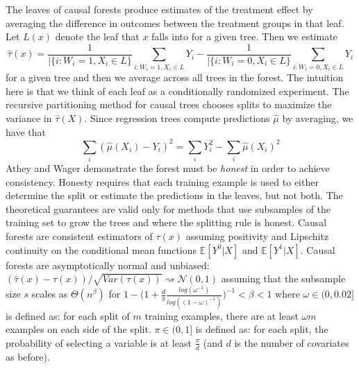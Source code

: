 \documentclass{article}
\begin{document}
The leaves of causal forests produce estimates of the treatment effect by averaging the difference in outcomes between the treatment groups in that leaf. Let $L(x)$ denote the leaf that $x$ falls into for a given tree. Then we estimate 
\begin{equation}
    \hat{\tau}(x) = \frac{1}{|\{i: W_i =1, X_i \in L \}} \sum_{i: W_i =1, X_i \in L} Y_i - \frac{1}{|\{i: W_i =0, X_i \in L \}} \sum_{i: W_i =0, X_i \in L} Y_i
\end{equation}
for a given tree and then we average across all trees in the forest. The intuition here is that we think of each leaf as a conditionally randomized experiment. 
The recursive partitioning method for causal trees chooses splits to maximize the variance in $\hat{\tau}(X)$\cite{athey2016recursive}. Since regression trees compute predictions $\hat{\mu}$ by averaging, we have that 
\begin{equation}
    \sum_i (\hat{\mu}(X_i) - Y_i)^2 = \sum_i Y_i^2 - \sum_i \hat{\mu}(X_i)^2
\end{equation}
Athey and Wager demonstrate the forest must be \textit{honest} in order to achieve consistency. Honesty requires that each training example is used to either determine the split or estimate the predictions in the leaves, but not both. The theoretical guarantees are valid only for methods that use subsamples of the training set to grow the trees and where the splitting rule is honest.
Causal forests are consistent estimators of $\tau(x)$ assuming positivity and Lipschitz continuity on the conditional mean functions $\mathbb{E}[ Y^0 |X]$ and $\mathbb{E}[ Y^1 |X]$. Causal forests are asymptotically normal and unbiased: \\$(\hat{\tau}(x) - \tau(x)) / \sqrt{Var(\hat{\tau}(x))}  \rightsquigarrow \mathcal{N}(0,1)$
assuming that the subsample size $s$ scales as $\Theta(n^{\beta})$ for $1- \Big( 1 + \frac{d}{\pi} \frac{log(\omega^{-1})}{log((1- \omega)^{-1})}\Big)^{-1} < \beta < 1$
where $\omega \in (0, 0.02]$ is defined as: for each split of $m$ training examples, there are at least $\omega m$ examples on each side of the split. $\pi \in (0, 1]$ is defined as: for each split, the probability of selecting a variable is at least $\frac{\pi}{d}$ (and $d$ is the number of covariates as before).

\end{document}
